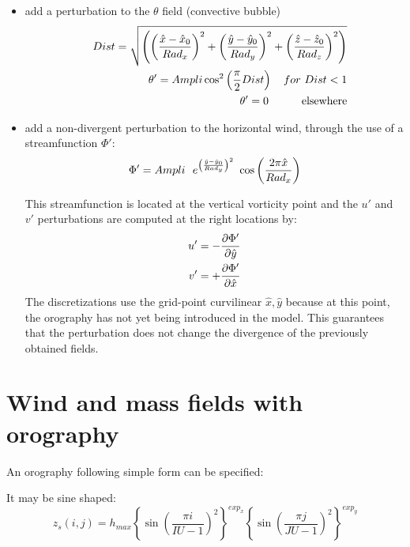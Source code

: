 \begin{itemize}
\item
add a perturbation to the $\theta $ field (convective bubble)
\begin{eqnarray}
&&Dist = \sqrt{ \left( \left( { \hat{x} - \hat{x}_0    \over  Rad_x } \right) ^2 +
                       \left( { \hat{y} - \hat{y}_0    \over  Rad_y } \right) ^2 +
                       \left( { \hat{z} - \hat{z}_0    \over  Rad_z } \right) ^2
                \right)       }  \nonumber \\
&&\theta ' =  Ampli \cos ^2  \left( {\pi \over 2} Dist  \right)  \ \ \
for \ Dist < 1  \nonumber \\
&&\theta ' = 0  \ \ \  \ \ \  \ \ \  \mbox{elsewhere}  \nonumber
\end{eqnarray}

\item
add a non-divergent perturbation to the horizontal wind, through the use of a
streamfunction $\Phi '$:
\begin{equation}
\Phi ' = Ampli \ \  e^{\left( { \hat{y} - \hat{y}_0    \over  Rad_y } \right) ^2 }
\  \cos \left( {2 \pi  \hat{x} \over  Rad_x } \right)   \nonumber
\end{equation}

This streamfunction is located at the vertical vorticity point and the $u'$
and $v'$ perturbations are computed at the right locations by:
\begin{eqnarray}
u' = - { \partial \Phi ' \over \partial \hat{y} } \nonumber \\
v' = + { \partial \Phi ' \over \partial \hat{x} } \nonumber
\end{eqnarray}
The discretizations use the grid-point curvilinear $ \hat{x}, \hat{y}$ because
at this point, the orography has  not yet  being  introduced in  the model.
This guarantees that the perturbation does not change the  divergence of the
previously obtained fields.
\end{itemize}



\section{Wind and mass fields with orography}

An orography following simple form can be specified:

It may be sine shaped:
$$
z_{s}(i,j) = h_{max} \left\{  \sin \left( \dfrac{\pi i}{IU-1}\right)^{2}
\right\}^{exp_{x}}\left\{  \sin \left( \dfrac{\pi j}{JU-1}\right)^{2}
\right\}^{exp_{y}}
$$

